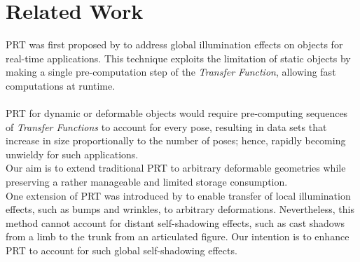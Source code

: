 \section{Related Work}
PRT was first proposed by \cite{sloan2002precomputed} to address global illumination effects on objects for real-time applications. This technique exploits the limitation of static objects by making a single pre-computation step of the \textit{Transfer Function}, allowing fast computations at runtime. \\
\\
PRT for dynamic or deformable objects would require pre-computing sequences of \textit{Transfer Functions} to account for every pose, resulting in data sets that increase in size proportionally to the number of poses; hence, rapidly becoming unwieldy for such applications.\\
Our aim is to extend traditional PRT to arbitrary deformable geometries while preserving a rather manageable and limited storage consumption. \\
One extension of PRT was introduced by  \cite{local-deformable-precomputed-radiance-transfer} to enable transfer of local illumination effects, such as bumps and wrinkles, to arbitrary deformations.  Nevertheless, this method cannot account for distant self-shadowing effects, such as cast shadows from a limb to the trunk from an articulated figure. Our intention is to enhance PRT to account for such global self-shadowing effects.\\
